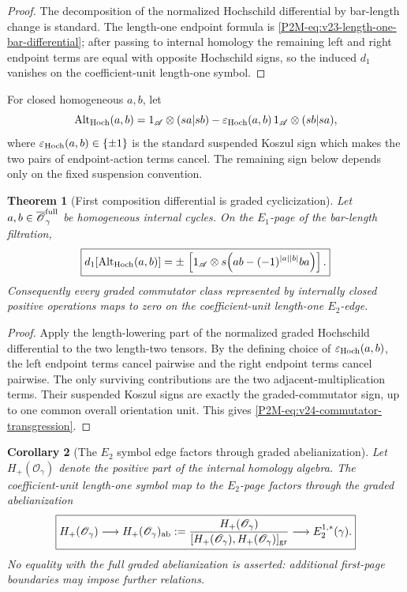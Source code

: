 \documentclass[11pt]{article}
\newtheorem{theorem}{Theorem}[section]
\newtheorem{corollary}[theorem]{Corollary}
\theoremstyle{remark}
\begin{document}
\begin{proof}
The decomposition of the normalized Hochschild differential by bar-length
change is standard.  The length-one endpoint formula is
\eqref{P2M-eq:v23-length-one-bar-differential}; after passing to internal
homology the remaining left and right endpoint terms are equal with opposite
Hochschild signs, so the induced \(d_1\) vanishes on the coefficient-unit
length-one symbol.
\end{proof}

For closed homogeneous \(a,b\), let
\[
 \operatorname{Alt}_{\rm Hoch}(a,b)
 =
 1_{\mathscr A}\otimes(sa|sb)
 -
 \varepsilon_{\rm Hoch}(a,b)\,
 1_{\mathscr A}\otimes(sb|sa),
\]
where \(\varepsilon_{\rm Hoch}(a,b)\in\{\pm1\}\) is the standard suspended
Koszul sign which makes the two pairs of endpoint-action terms cancel.  The
remaining sign below depends only on the fixed suspension convention.

\begin{theorem}[First composition differential is graded cyclicization]
\label{P2M-thm:v24-first-composition-cyclicization}
Let \(a,b\in\overline{\mathscr O}_\gamma^{\rm full}\) be homogeneous internal
cycles.  On the \(E_1\)-page of the bar-length filtration,
\begin{equation}\label{P2M-eq:v24-commutator-transgression}
 \boxed{
 d_1\!\left[\operatorname{Alt}_{\rm Hoch}(a,b)\right]
 =
 \pm\,
 \left[
   1_{\mathscr A}\otimes
   s\!\left(
     ab-(-1)^{|a||b|}ba
   \right)
 \right].}
\end{equation}
Consequently every graded commutator class represented by internally closed
positive operations maps to zero on the coefficient-unit length-one
\(E_2\)-edge.
\end{theorem}

\begin{proof}
Apply the length-lowering part of the normalized graded Hochschild
differential to the two length-two tensors.  By the defining choice of
\(\varepsilon_{\rm Hoch}(a,b)\), the left endpoint terms cancel pairwise and
the right endpoint terms cancel pairwise.  The only surviving contributions
are the two adjacent-multiplication terms.  Their suspended Koszul signs are
exactly the graded-commutator sign, up to one common overall orientation unit.
This gives \eqref{P2M-eq:v24-commutator-transgression}.
\end{proof}

\begin{corollary}[The \(E_2\) symbol edge factors through graded abelianization]
\label{P2M-cor:v24-E2-graded-abelianization}
Let \(H_+(\mathscr O_\gamma)\) denote the positive part of the internal
homology algebra.  The coefficient-unit length-one symbol map to the
\(E_2\)-page factors through the graded abelianization
\begin{equation}
 \boxed{
 H_+(\mathscr O_\gamma)
 \longrightarrow
 H_+(\mathscr O_\gamma)_{\rm ab}
 :=
 \frac{H_+(\mathscr O_\gamma)}
      {[H_+(\mathscr O_\gamma),H_+(\mathscr O_\gamma)]_{\rm gr}}
 \longrightarrow
 E_2^{1,*}(\gamma).}
\end{equation}
No equality with the full graded abelianization is asserted: additional
first-page boundaries may impose further relations.
\end{corollary}
\end{document}
